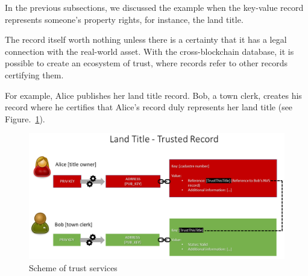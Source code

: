 \begin{multicols}{2}
In the previous subsections, we discussed the example when the key-value record represents someone’s property rights, for instance, the land title.

The record itself worth nothing unless there is a certainty that it has a legal connection with the real-world asset. With the cross-blockchain database, it is possible to create an ecosystem of trust, where records refer to other records certifying them.

For example, Alice publishes her land title record. Bob, a town clerk, creates his record where he certifies that Alice’s record duly represents her land title (see Figure.~\ref{chap1-fig07}).
\end{multicols}

\begin{figure}[H]
\centering
\includegraphics[scale=1.8]{src/Figures/chap1/chap1-fig07.jpg}
\caption{Scheme of trust services}\label{chap1-fig07}
\end{figure}

